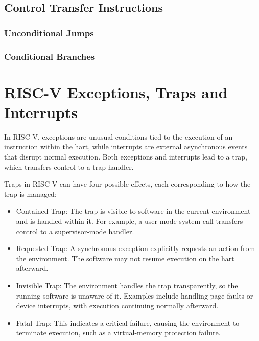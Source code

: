 \subsection{Control Transfer Instructions}
\label{subsec:riscv_controltransfer}

\subsubsection{Unconditional Jumps}
\label{subsubsec:riscv_unconditionalj}

\subsubsection{Conditional Branches}
\label{subsubsec:riscv_conditionalb}

\section{RISC-V Exceptions, Traps and Interrupts}
\label{sec:riscv_eti}

In RISC-V, exceptions are unusual conditions tied to the execution of an instruction
within the hart, while interrupts are external asynchronous events that disrupt
normal execution. Both exceptions and interrupts lead to a trap, which transfers
control to a trap handler.

Traps in RISC-V can have four possible effects, each corresponding to how the trap
is managed:

\begin{itemize}
  \item Contained Trap: The trap is visible to software in the current
    environment and is handled within it. For example, a user-mode system call
    transfers control to a supervisor-mode handler.

  \item Requested Trap: A synchronous exception explicitly requests an action
    from the environment. The software may not resume execution on the hart afterward.

  \item Invisible Trap: The environment handles the trap transparently, so the running
    software is unaware of it. Examples include handling page faults or device
    interrupts, with execution continuing normally afterward.

  \item Fatal Trap: This indicates a critical failure, causing the environment to
    terminate execution, such as a virtual-memory protection failure.
\end{itemize}

